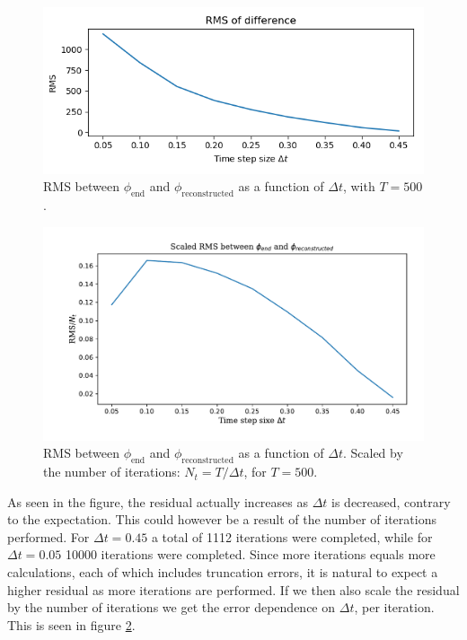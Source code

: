 \documentclass[sigconf]{acmart}
\begin{document}
\begin{figure}
	\centering
	\includegraphics[width=\linewidth]{mean_curvature_flow_ex1.png}
	\caption{RMS between $  \phi_{\text{end}} $ and $ \phi_{\text{reconstructed}} $ as a function of $ \Delta t $, with $ T=500 $.}
	\label{fig:residual}
\end{figure}
\begin{figure}
	\centering
	\includegraphics[width=\linewidth]{mean_curvature_flow_ex2.pdf}
	\caption{RMS between $  \phi_{\text{end}} $ and $ \phi_{\text{reconstructed}} $ as a function of $ \Delta t $. Scaled by the number of iterations: $ N_t = T/\Delta t $, for $ T=500 $.}
	\label{fig:scaled_residual}
\end{figure}
As seen in the figure, the residual actually increases as $ \Delta t $ is decreased, contrary to the expectation. This could however be a result of the number of iterations performed. For $ \Delta t = 0.45 $ a total of 1112 iterations were completed, while for $ \Delta t = 0.05 $ 10000 iterations were completed. Since more iterations equals more calculations, each of which includes truncation errors, it is natural to expect a higher residual as more iterations are performed. If we then also scale the residual by the number of iterations we get the error dependence on $ \Delta t $, per iteration. This is seen in figure \ref{fig:scaled_residual}.
\end{document}
